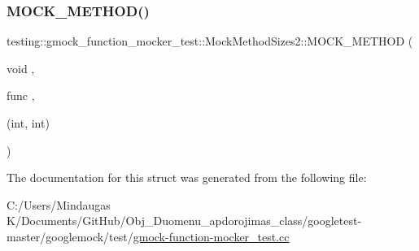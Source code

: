 \mbox{\label{structtesting_1_1gmock__function__mocker__test_1_1_mock_method_sizes2_a6d32c0eaef58a3fa35d67a2fe903d93b}} 
\subsubsection{\texorpdfstring{MOCK\_METHOD()}{MOCK\_METHOD()}\hspace{0.1cm}{\footnotesize\ttfamily [2/2]}}
{\footnotesize\ttfamily testing\+::gmock\+\_\+function\+\_\+mocker\+\_\+test\+::\+Mock\+Method\+Sizes2\+::\+M\+O\+C\+K\+\_\+\+M\+E\+T\+H\+OD (\begin{DoxyParamCaption}\item[{void}]{,  }\item[{func}]{,  }\item[{(int, int)}]{ }\end{DoxyParamCaption})}



The documentation for this struct was generated from the following file\+:\begin{DoxyCompactItemize}
\item 
C\+:/\+Users/\+Mindaugas K/\+Documents/\+Git\+Hub/\+Obj\+\_\+\+Duomenu\+\_\+apdorojimas\+\_\+class/googletest-\/master/googlemock/test/\mbox{\hyperlink{googletest-master_2googlemock_2test_2gmock-function-mocker__test_8cc}{gmock-\/function-\/mocker\+\_\+test.\+cc}}\end{DoxyCompactItemize}
